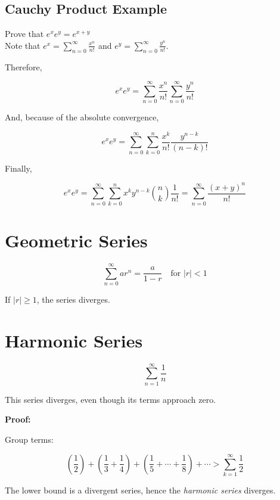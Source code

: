 \subsection{Cauchy Product Example}

Prove that \(e^x  e^y = e^{x + y}\)\\
Note that \(e^x = \sum_{n = 0}^{\infty} \frac{x^n}{n!}\) and \(e^y = \sum_{n = 0}^{\infty} \frac{y^n}{n!}\).

Therefore,

\[
    e^x e^y = \sum_{n = 0}^{\infty} \frac{x^n}{n!} \sum_{n = 0}^{\infty} \frac{y^n}{n!}
\]

And, because of the absolute convergence,

\[
    e^x e^y = \sum_{n = 0}^{\infty}\sum_{k = 0}^{n} \frac{x^k}{n!} \frac{y^{n - k}}{(n-k)!}
\]

Finally,

\[
    e^x e^y = \sum_{n = 0}^{\infty}\sum_{k = 0}^{n}x^k y^{n - k} \binom{n}{k} \frac{1}{n!} = \sum_{n = 0}^{\infty} \frac{{(x + y)}^n}{n!}
\]
\QED

\section{Geometric Series}

\[
    \sum_{n=0}^\infty ar^n = \frac{a}{1 - r} \quad \text{for } |r| < 1
\]

If \(|r| \ge 1\), the series diverges.

\section{Harmonic Series}

\[
    \sum_{n=1}^{\infty} \frac{1}{n}
\]

This series diverges, even though its terms approach zero.

\textbf{Proof:} 

Group terms:

\[
    \left(\frac{1}{2}\right) + \left(\frac{1}{3} + \frac{1}{4}\right) + \left(\frac{1}{5} + \cdots + \frac{1}{8}\right) + \cdots > 
    \sum_{k=1}^\infty \frac{1}{2}
\]

The lower bound is a divergent series, hence the \emph{harmonic series} diverges.
